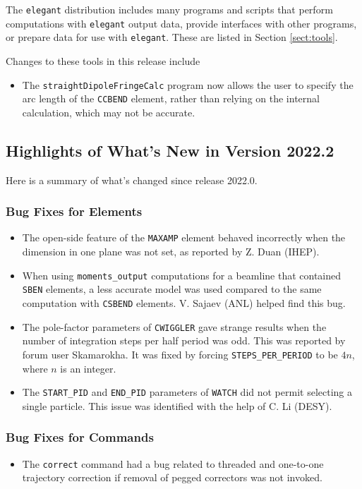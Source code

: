 \documentclass[11pt]{article}
\begin{document}
The {\tt elegant} distribution includes many programs and scripts that perform computations with {\tt elegant}
output data, provide interfaces with other programs, or prepare data for use with {\tt elegant}. These
are listed in Section \ref{sect:tools}. 

Changes to these tools in this release include
\begin{itemize}
\item The \verb|straightDipoleFringeCalc| program now allows the user to specify the arc length of the
  \verb|CCBEND| element, rather than relying on the internal calculation, which may not be accurate.
\end{itemize}

\subsection{Highlights of What's New in Version 2022.2}

Here is a summary of what's changed since release 2022.0. 

\subsubsection{Bug Fixes for Elements}

\begin{itemize}
\item The open-side feature of the \verb|MAXAMP| element behaved incorrectly when the dimension in one
  plane was not set, as reported by Z. Duan (IHEP). 
\item When using \verb|moments_output| computations for a beamline that contained \verb|SBEN| elements,
  a less accurate model was used compared to the same computation with \verb|CSBEND| elements.
  V. Sajaev (ANL) helped find this bug.
\item The pole-factor parameters of \verb|CWIGGLER| gave strange results when the number of integration
  steps per half period was odd. This was reported by forum user Skamarokha. It was fixed by forcing
  \verb|STEPS_PER_PERIOD| to be $4n$, where $n$ is an integer.
\item The \verb|START_PID| and \verb|END_PID| parameters of  \verb|WATCH| did not permit selecting a 
  single particle. This issue was identified with the help of C. Li (DESY).
\end{itemize}

\subsubsection{Bug Fixes for Commands}
\begin{itemize}
\item The \verb|correct| command had a bug related to threaded and one-to-one trajectory correction if
  removal of pegged correctors was not invoked.
\end{itemize}
\end{document}
